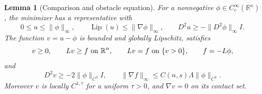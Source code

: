\documentclass[11pt]{article}
\numberwithin{equation}{section}
\newtheorem{lemma}[theorem]{Lemma}
\theoremstyle{remark}
\newcommand{\R}{\mathbb R}
\newcommand{\norm}[1]{\lVert #1\rVert}
\newcommand{\Lip}{\operatorname{Lip}}
\begin{document}
\begin{lemma}[Comparison and obstacle equation]\label{lem:minimizer}
For a nonnegative $\phi\in C_c^\infty(\R^n)$, the minimizer has a representative with
\begin{equation}\label{eq:elementarybounds}
 0\le u\le\norm\phi_\infty,\qquad
 \Lip(u)\le\norm{\nabla\phi}_\infty,\qquad
 D^2u\ge-\norm{D^2\phi}_\infty I.
\end{equation}
The function $v=u-\phi$ is bounded and globally Lipschitz, satisfies
\begin{equation}\label{eq:vproblem}
 v\ge0,\qquad L v\ge f\ \hbox{on }\R^n,\qquad
 L v=f\ \hbox{on }\{v>0\},\qquad f=-L\phi,
\end{equation}
and
\begin{equation}\label{eq:forcing}
 D^2v\ge-2\norm\phi_{C^3}I,
 \qquad \norm{\nabla f}_\infty\le C(n,s)\Lambda\norm\phi_{C^3}.
\end{equation}
Moreover $v$ is locally $C^{1,\tau}$ for a uniform $\tau>0$, and $\nabla v=0$ on its contact set.
\end{lemma}
\end{document}
